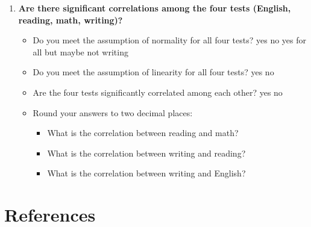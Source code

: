 \documentclass[
]{book}
\begin{document}
\begin{enumerate}
\def\labelenumi{\arabic{enumi}.}
\item
  \textbf{Are there significant correlations among the four tests (English, reading, math, writing)?}

  \begin{itemize}
  \item
    Do you meet the assumption of normality for all four tests? yes no yes for all but maybe not writing
  \item
    Do you meet the assumption of linearity for all four tests? yes no
  \item
    Are the four tests significantly correlated among each other? yes no
  \item
    Round your answers to two decimal places:

    \begin{itemize}
    \item
      What is the correlation between reading and math?
    \item
      What is the correlation between writing and reading?
    \item
      What is the correlation between writing and English?
    \end{itemize}
  \end{itemize}
\end{enumerate}

\hypertarget{appendix-appendices}{%
\appendix}


\hypertarget{references}{%
\chapter{References}\label{references}}

  
\end{document}
